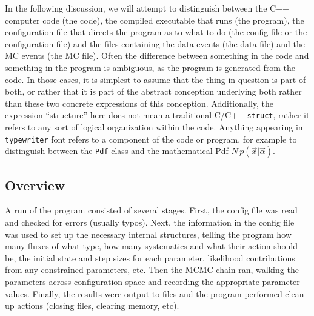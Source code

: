 In the following discussion, we will attempt to distinguish between
the C++ computer code (the code), the compiled executable that runs
(the program), the configuration file that directs the program as to
what to do (the config file or the configuration file) and the files
containing the data events (the data file) and the MC events (the MC
file).  Often the difference between something in the code and
something in the program is ambiguous, as the program is generated
from the code.  In those cases, it is simplest to assume that the
thing in question is part of both, or rather that it is part of the
abstract conception underlying both rather than these two concrete
expressions of this conception.  Additionally, the expression
``structure'' here does not mean a traditional C/C++ {\tt struct},
rather it refers to any sort of logical organization within the code.
Anything appearing in {\tt typewriter} font refers to a component of
the code or program, for example to distinguish between the {\tt Pdf}
class and the mathematical Pdf $N\,p(\vec{x}|\vec{\alpha})$.

\subsection{Overview}
A run of the program consisted of several stages.  First, the config
file was read and checked for errors (usually typos).  Next, the
information in the config file was used to set up the necessary
internal structures, telling the program how many fluxes of what type,
how many systematics and what their action should be, the initial
state and step sizes for each parameter, likelihood contributions from
any constrained parameters, etc.  Then the MCMC chain ran, walking the
parameters across configuration space and recording the appropriate
parameter values.  Finally, the results were output to files and the
program performed clean up actions (closing files, clearing memory,
etc).

